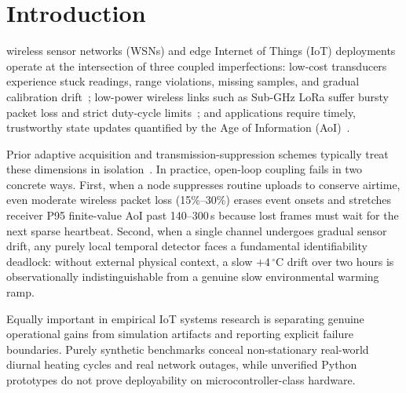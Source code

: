 \documentclass[journal,twoside,web]{ieeecolor}
\begin{document}
\maketitle

\section{Introduction}
 wireless sensor networks (WSNs) and edge Internet of Things (IoT) deployments operate at the intersection of three coupled imperfections: low-cost transducers experience stuck readings, range violations, missing samples, and gradual calibration drift~\cite{sharma2010faults,ni2009sensor,chai2022stability}; low-power wireless links such as Sub-GHz LoRa suffer bursty packet loss and strict duty-cycle limits~\cite{augustin2016lora,gilbert1960capacity,chache2024lora}; and applications require timely, trustworthy state updates quantified by the Age of Information (AoI)~\cite{kaul2012realtime,yates2021age,kahraman2024survey}.

Prior adaptive acquisition and transmission-suppression schemes typically treat these dimensions in isolation~\cite{rao2019adaptive,masoum2012quality,dias2017dual,arnaiz2024energy,wang2023emd}. In practice, open-loop coupling fails in two concrete ways. First, when a node suppresses routine uploads to conserve airtime, even moderate wireless packet loss (15\%--30\%) erases event onsets and stretches receiver P95 finite-value AoI past 140--300\,s because lost frames must wait for the next sparse heartbeat. Second, when a single channel undergoes gradual sensor drift, any purely local temporal detector faces a fundamental identifiability deadlock: without external physical context, a slow $+4\,^{\circ}\text{C}$ drift over two hours is observationally indistinguishable from a genuine slow environmental warming ramp.

Equally important in empirical IoT systems research is separating genuine operational gains from simulation artifacts and reporting explicit failure boundaries. Purely synthetic benchmarks conceal non-stationary real-world diurnal heating cycles and real network outages, while unverified Python prototypes do not prove deployability on microcontroller-class hardware.
\end{document}
